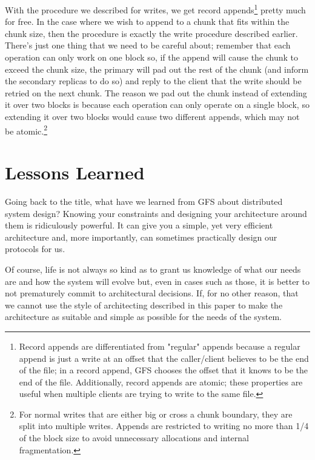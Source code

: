 \documentclass[11pt]{article}
\begin{document}
With the procedure we described for writes, we get record appends\footnote{Record appends are differentiated from "regular" appends because a regular append is just a write at an offset that the caller/client believes to be the end of the file;
in a record append, GFS chooses the offset that it knows to be the end of the file. Additionally, record appends are atomic; these properties are useful when multiple clients are trying to
write to the same file.} pretty much for free. In the case where we wish to append to a chunk that fits within the chunk size,
then the procedure is exactly the write procedure described earlier. There's just one thing that we need to be careful about;
remember that each operation can only work on one block so, if the append will cause the chunk to exceed the chunk size, the primary will pad out the rest of the chunk
(and inform the secondary replicas to do so) and reply to the client that the write should be retried on the next chunk. The reason we pad out the chunk instead of extending it over two
blocks is because each operation can only operate on a single block, so extending it over two blocks would cause two different appends, which may not be atomic.\footnote{For normal writes that are either big or cross a chunk boundary, they are split into multiple writes. Appends are restricted to writing no more than 1/4 of the block size to avoid
unnecessary allocations and internal fragmentation.}

\section*{Lessons Learned}
\label{sec:org9cc0593}
Going back to the title, what have we learned from GFS about distributed system design? Knowing your constraints and designing your architecture around them is ridiculously powerful.
It can give you a simple, yet very efficient architecture and, more importantly, can sometimes practically design our protocols for us.

Of course, life is not always so kind as to grant us knowledge of what our needs are and how the system will evolve but, even in cases such as those, it is better to not prematurely
commit to architectural decisions. If, for no other reason, that we cannot use the style of architecting described in this paper to make the architecture as suitable and simple
as possible for the needs of the system.
\end{document}
